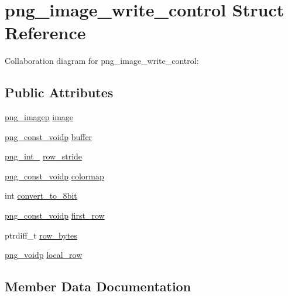 \hypertarget{structpng__image__write__control}{}\section{png\+\_\+image\+\_\+write\+\_\+control Struct Reference}
\label{structpng__image__write__control}


Collaboration diagram for png\+\_\+image\+\_\+write\+\_\+control\+:
\subsection*{Public Attributes}
\begin{DoxyCompactItemize}
\item 
\hyperlink{png_8h_a849cd575ed0f106df40172e07d04c0f8}{png\+\_\+imagep} \hyperlink{structpng__image__write__control_a5187b99ed3fd962d802e0e9c3a61f4ee}{image}
\item 
\hyperlink{pngconf_8h_aa2688aa7a3bd08819701a744f9a5716c}{png\+\_\+const\+\_\+voidp} \hyperlink{structpng__image__write__control_a11f225e24d735bda426ca5319d4c848f}{buffer}
\item 
\hyperlink{pngrutil_8c_a1f5cf5f6a913e237d8a9a7c0a6ea1714}{png\+\_\+int\+\_} \hyperlink{structpng__image__write__control_aa7da32d072dbaf2d06bf4eea1a800114}{row\+\_\+stride}
\item 
\hyperlink{pngconf_8h_aa2688aa7a3bd08819701a744f9a5716c}{png\+\_\+const\+\_\+voidp} \hyperlink{structpng__image__write__control_a7e73acce8ac1c4fc12fe2721f7e0ae1f}{colormap}
\item 
int \hyperlink{structpng__image__write__control_a22d216c23ede3b5553ab4002b89d1341}{convert\+\_\+to\+\_\+8bit}
\item 
\hyperlink{pngconf_8h_aa2688aa7a3bd08819701a744f9a5716c}{png\+\_\+const\+\_\+voidp} \hyperlink{structpng__image__write__control_abc5f08f4e87157c3deac31eac974814b}{first\+\_\+row}
\item 
ptrdiff\+\_\+t \hyperlink{structpng__image__write__control_ad5026b060a45346d968b08b76d40b66c}{row\+\_\+bytes}
\item 
\hyperlink{pngconf_8h_a9dc088c359b6d7e45682af63a3361b58}{png\+\_\+voidp} \hyperlink{structpng__image__write__control_a5942b04084bbf48607b6ae67fef7195d}{local\+\_\+row}
\end{DoxyCompactItemize}


\subsection{Member Data Documentation}
\hypertarget{structpng__image__write__control_a11f225e24d735bda426ca5319d4c848f}{}
